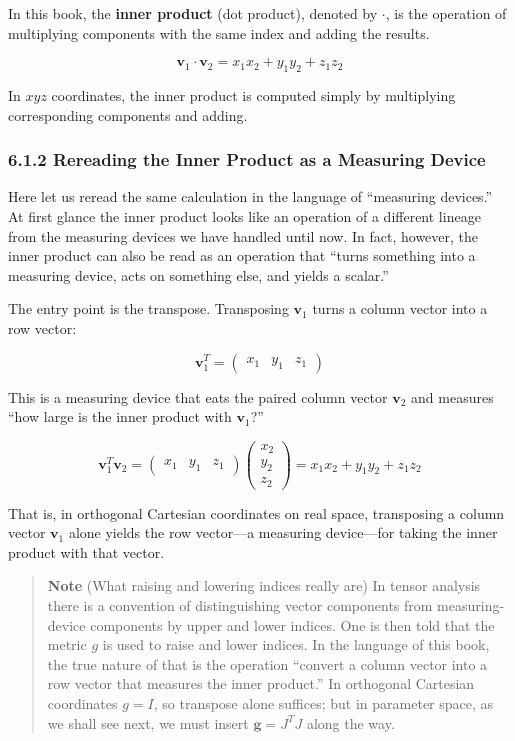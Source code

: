 \documentclass[a4paper,12pt,openany]{book}
\begin{document}
In this book, the \textbf{inner product} (dot product), denoted by
\(\cdot\), is the operation of multiplying components with the same
index and adding the results.

\[\mathbf{v}_1 \cdot \mathbf{v}_2 = x_1 x_2 + y_1 y_2 + z_1 z_2\]

In \(xyz\) coordinates, the inner product is computed simply by
multiplying corresponding components and adding.

\hypertarget{rereading-the-inner-product-as-a-measuring-device}{%
\subsubsection{6.1.2 Rereading the Inner Product as a Measuring
Device}\label{rereading-the-inner-product-as-a-measuring-device}}

Here let us reread the same calculation in the language of ``measuring
devices.'' At first glance the inner product looks like an operation of
a different lineage from the measuring devices we have handled until
now. In fact, however, the inner product can also be read as an
operation that ``turns something into a measuring device, acts on
something else, and yields a scalar.''

The entry point is the transpose. Transposing \(\mathbf{v}_1\) turns a
column vector into a row vector:

\[\mathbf{v}_1^T = \begin{pmatrix} x_1 & y_1 & z_1 \end{pmatrix}\]

This is a measuring device that eats the paired column vector
\(\mathbf{v}_2\) and measures ``how large is the inner product with
\(\mathbf{v}_1\)?''

\[\mathbf{v}_1^T\mathbf{v}_2
= \begin{pmatrix} x_1 & y_1 & z_1 \end{pmatrix}
\begin{pmatrix} x_2 \\ y_2 \\ z_2 \end{pmatrix}
= x_1x_2 + y_1y_2 + z_1z_2\]

That is, in orthogonal Cartesian coordinates on real space, transposing
a column vector \(\mathbf{v}_1\) alone yields the row vector—a
measuring device—for taking the inner product with that vector.

\begin{quote}
\textbf{Note} (What raising and lowering indices really are) In tensor
analysis there is a convention of distinguishing vector components from
measuring-device components by upper and lower indices. One is then told
that the metric \(g\) is used to raise and lower indices. In the
language of this book, the true nature of that is the operation
``convert a column vector into a row vector that measures the inner
product.'' In orthogonal Cartesian coordinates \(g=I\), so transpose
alone suffices; but in parameter space, as we shall see next, we must
insert \(\mathbf{g}=J^T J\) along the way.
\end{quote}
\end{document}
